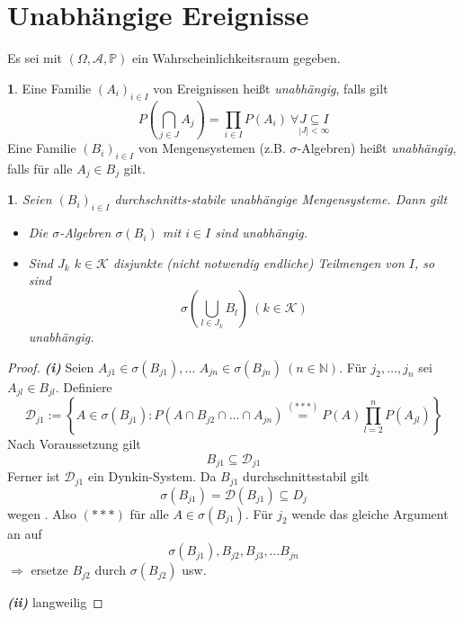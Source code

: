 \documentclass[10pt,a4paper]{report}
\numberwithin{equation}{section}
\numberwithin{figure}{section}
\theoremstyle{plain}
\theoremstyle{definition}
\newtheorem{defn}[thm]{\protect\definitionname}
\theoremstyle{remark}
\theoremstyle{plain}
\newtheorem{prop}[thm]{\protect\propositionname}
\providecommand{\definitionname}{Definition}
\providecommand{\propositionname}{Satz}
\newcommand{\1}{ \mathbb{1} } %
\begin{document}
\section{Unabhängige Ereignisse}
Es sei mit $\left(\Omega,\mathcal{A},\mathbb{P}\right)$ ein Wahrscheinlichkeitsraum
gegeben.
\begin{defn}   %
  Eine Familie $\left(A_{i}\right)_{i\in I}$ von Ereignissen heißt
  \emph{unabhängig}, falls gilt
  \begin{equation}
    P\left(\bigcap_{j\in J}A_{j}\right)=\prod_{i\in I}P\left(A_{i}\right)\ \forall\underset{\left|J\right|<\infty}{J\subseteq I}\label{eq:def1.1}
  \end{equation}
  Eine Familie $\left(B_{i}\right)_{i\in I}$ von Mengensystemen (z.B.
  $\sigma$-Algebren) heißt \emph{unabhängig}, falls für
  alle $A_{j}\in B_{j}$ gilt.
\end{defn}
\begin{prop}  %
  Seien $\left(B_{i}\right)_{i\in I}$ durchschnitts-stabile unabhängige
  Mengensysteme. Dann gilt
  \begin{itemize}
  \item [{(i)}] Die $\sigma$-Algebren $\sigma\left(B_{i}\right)$ mit $i\in I$
    sind unabhängig.
  \item [{(ii)}] Sind $J_{k}$ $k\in\mathcal{K}$ disjunkte (nicht notwendig
    endliche) Teilmengen von $I$, so sind
    \[
    \sigma\left(\bigcup_{l\in J_{k}}B_{l}\right)\ \left(k\in\mathcal{K}\right)
    \]
    unabhängig. \label{s1.2(ii)}
  \end{itemize}
\end{prop}
\begin{proof}
  \textbf{\emph{(i)}} Seien $A_{j1}\in\sigma\left(B_{j1}\right),\ldots$
  $A_{jn}\in\sigma\left(B_{jn}\right)\ \left(n\in\mathbb{N}\right)$.
  Für $j_{2},\ldots,j_{n}$ sei $A_{jl}\in B_{jl}$. Definiere
  \begin{equation}
    \mathcal{D}_{j1}:=\left\{ A\in\sigma\left(B_{j1}\right):P\left(A\cap B_{j2}\cap\ldots\cap A_{jn}\right)\overset{(***)}{=}P\left(A\right)\prod_{l=2}^{n}P\left(A_{jl}\right)\right\} \label{eq:b1.2**-1}
  \end{equation}
  Nach Voraussetzung gilt
  \begin{equation}
    B_{j1}\subseteq\mathcal{D}_{j1}\label{eq:b1.2**}
  \end{equation}
  Ferner ist $\mathcal{D}_{j1}$ ein Dynkin-System. Da $B_{j1}$ durchschnittsstabil
  gilt
  \[
  \sigma\left(B_{j1}\right)=\mathcal{D}\left(B_{j1}\right)\subseteq D_{j}
  \]
  wegen . Also $(***)$ für alle $A\in\sigma\left(B_{j1}\right)$.
  Für $j_{2}$ wende das gleiche Argument an auf
  \[
  \sigma\left(B_{j1}\right),B_{j2},B_{j3},\ldots B_{jn}
  \]
  $\Rightarrow$ ersetze $B_{j2}$ durch $\sigma\left(B_{j2}\right)$
  usw.

  \textbf{\emph{(ii)}} langweilig
\end{proof}
\end{document}
